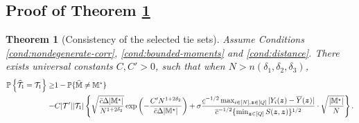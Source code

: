 \documentclass[12pt]{article}
\newtheorem{theorem}{Theorem}
\begin{document}
\subsection{Proof of Theorem \ref{thm:wt-converge}}

\begin{theorem}[Consistency of the selected tie sets]\label{thm:wt-converge}
Assume Conditions \ref{cond:nondegenerate-corr}, \ref{cond:bounded-moments} and \ref{cond:distance}.  There exists universal constants $C,C'>0$, such that
when $N>n(\delta_1,\delta_2,\delta_3)$, 
\begin{align*}
   {\mathbb{P}}\left\{\widehat{{\mathcal{T}}}_{1} = {{\mathcal{T}}}_{1} \right\} 
   \ge&  1 - {\mathbb{P}}\{\widehat{{\mathbb{M}}}\neq {\mathbb{M}}^\star\}\\
    -& C|{\mathcal{T}}'||{\mathcal{T}}_{1}|\left\{\sqrt{\frac{\bar{c}\Delta|{\mathbb{M}}^\star|}{N^{1+2\delta_2}}}\exp\left(-\frac{C'N^{1+2\delta_2}}{\bar{c}\Delta|{\mathbb{M}}^\star|}\right)+\sigma   \frac{ \underline{c}^{-1/2} \max_{i\in[N],{\boldsymbol{z}}\in[Q]}|Y_i({\boldsymbol{z}})-\overline{Y}({\boldsymbol{z}})|}{ {\overline{c}^{-1/2} \{\min_{{\boldsymbol{z}}\in[Q]} S({\boldsymbol{z}},{\boldsymbol{z}})}\}^{1/2}}\cdot \sqrt{\frac{|{\mathbb{M}}^\star|}{N}}\right\}.
\end{align*}


\end{theorem}
\end{document}
